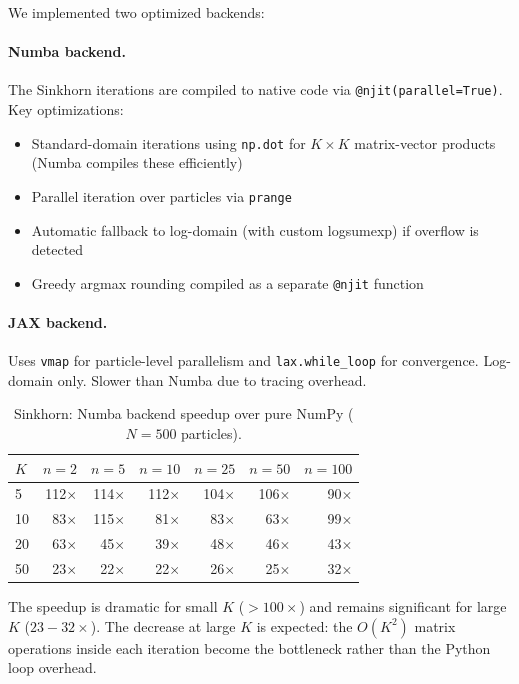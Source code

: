 \documentclass[11pt,a4paper]{article}
\begin{document}
We implemented two optimized backends:

\paragraph{Numba backend.} The Sinkhorn iterations are compiled to native code via \texttt{@njit(parallel=True)}. Key optimizations:
\begin{itemize}
  \item Standard-domain iterations using \texttt{np.dot} for $K \times K$ matrix-vector products (Numba compiles these efficiently)
  \item Parallel iteration over particles via \texttt{prange}
  \item Automatic fallback to log-domain (with custom logsumexp) if overflow is detected
  \item Greedy argmax rounding compiled as a separate \texttt{@njit} function
\end{itemize}

\paragraph{JAX backend.} Uses \texttt{vmap} for particle-level parallelism and \texttt{lax.while\_loop} for convergence. Log-domain only. Slower than Numba due to tracing overhead.

\begin{table}[h!]
\centering
\caption{Sinkhorn: Numba backend speedup over pure NumPy ($N = 500$ particles).}
\label{tab:sinkhorn_speedup}
\begin{tabular}{l rrrrrr}
\toprule
$K$ & $n=2$ & $n=5$ & $n=10$ & $n=25$ & $n=50$ & $n=100$ \\
\midrule
5  & 112$\times$ & 114$\times$ & 112$\times$ & 104$\times$ & 106$\times$ & 90$\times$ \\
10 & 83$\times$ & 115$\times$ & 81$\times$ & 83$\times$ & 63$\times$ & 99$\times$ \\
20 & 63$\times$ & 45$\times$ & 39$\times$ & 48$\times$ & 46$\times$ & 43$\times$ \\
50 & 23$\times$ & 22$\times$ & 22$\times$ & 26$\times$ & 25$\times$ & 32$\times$ \\
\bottomrule
\end{tabular}
\end{table}

The speedup is dramatic for small $K$ ($> 100\times$) and remains significant for large $K$ ($23{-}32\times$). The decrease at large $K$ is expected: the $O(K^2)$ matrix operations inside each iteration become the bottleneck rather than the Python loop overhead.
\end{document}

